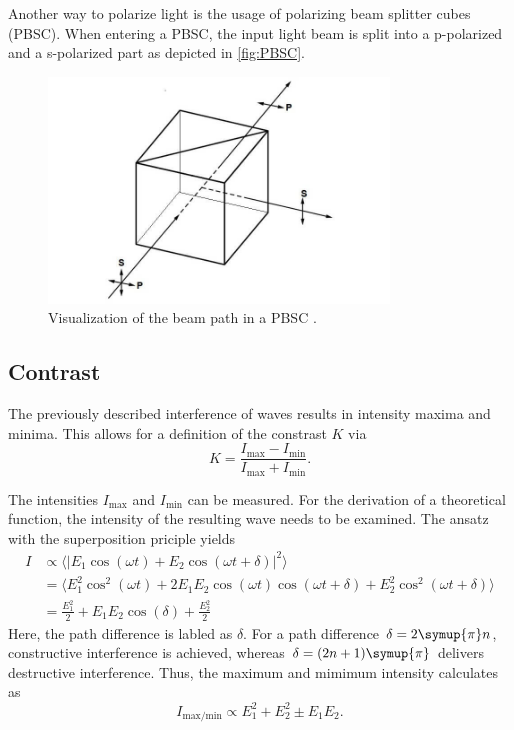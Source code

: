 Another way to polarize light is the usage of polarizing beam splitter cubes (PBSC). When entering a PBSC, the input light beam is split into a p-polarized and 
a s-polarized part as depicted in \autoref{fig:PBSC}.
\begin{figure}
    \centering
    \includegraphics[height=6cm]{content/pics/PBSC.jpg}
    \caption{Visualization of the beam path in a PBSC \cite{artifex-PBSC}.}
    \label{fig:PBSC}
\end{figure}

\subsection{Contrast}
\label{sec:Contrast}
The previously described interference of waves results in intensity maxima and minima. This allows for a definition of the constrast $K$ via
\begin{equation}
    K = \frac{I_{\text{max}} - I_{\text{min}}}{I_{\text{max}} + I_{\text{min}}}.
    \label{eq:Constrast}
\end{equation}

The intensities $I_{\text{max}}$ and $I_{\text{min}}$ can be measured. For the derivation of a theoretical function, the intensity of the resulting wave needs to be examined.
The ansatz with the superposition priciple yields
\begin{align*}
    I &\propto \langle|E_1\cos(\omega t) + E_2\cos(\omega t + \delta)|^2\rangle \\
      &= \langle E_1^2\cos^2(\omega t) + 2E_1E_2\cos(\omega t)\cos(\omega t + \delta)+ E_2^2\cos^2(\omega t + \delta)\rangle \\
      &= \frac{E_1^2}{2} + E_1E_2 \cos(\delta) + \frac{E_2^2}{2}
\end{align*}
Here, the path difference is labled as $\delta$. For a path difference $\delta = 2\symup{\pi}n$, constructive interference is achieved, whereas 
$\delta = (2n+1)\symup{\pi}$ delivers destructive interference. Thus, the maximum and mimimum intensity calculates as
\begin{equation*}
    I_{\text{max/min}} \propto E_1^2 + E_2^2 \pm E_1 E_2.
    \label{eq:I_max/min_temp}
\end{equation*}

